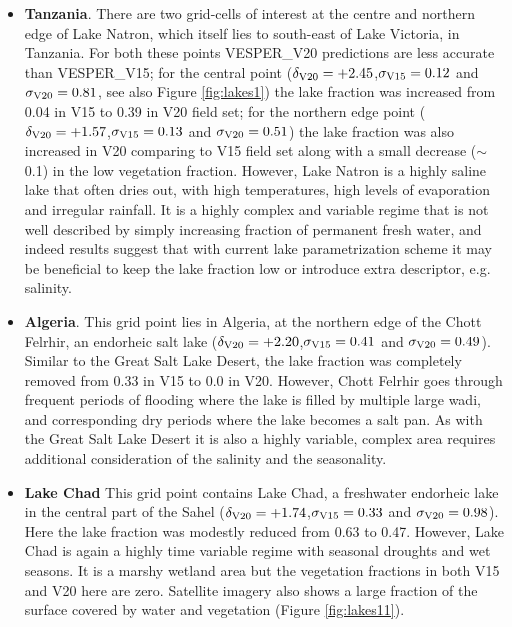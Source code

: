 \documentclass[hess, twostagejnl]{copernicus}
\begin{document}
\begin{itemize}
	\item \textbf{Tanzania}. There are two grid-cells of interest at the centre and northern edge of Lake Natron, which itself lies to south-east of Lake Victoria, in Tanzania. For both these points VESPER\_V20 predictions are less accurate than VESPER\_V15; for the central point ($\delta_{\rm V20} = +2.45$,$\sigma_{\rm V15} = 0.12$ and $\sigma_{\rm V20}=0.81$, see also Figure \ref{fig:lakes1}) the lake fraction was increased from 0.04 in V15 to 0.39 in V20 field set; for the northern edge point ($\delta_{\rm V20} = +1.57$,$\sigma_{\rm V15} = 0.13$ and $\sigma_{\rm V20}=0.51$) the lake fraction was also increased in V20 comparing to V15 field set along with a small decrease ($\sim$0.1) in the low vegetation fraction. However, Lake Natron is a highly saline lake that often dries out, with high temperatures, high levels of evaporation and irregular rainfall. It is a highly complex and variable regime that is not well described by simply increasing fraction of permanent fresh water, and indeed results suggest that with current lake parametrization scheme it may be beneficial to keep the lake fraction low or introduce extra descriptor, e.g. salinity. 

	\item \textbf{Algeria}. This grid point lies in Algeria, at the northern edge of the Chott Felrhir, an endorheic salt lake ($\delta_{\rm V20} = +2.20$,$\sigma_{\rm V15} = 0.41$ and $\sigma_{\rm V20}=0.49$). Similar to the Great Salt Lake Desert, the lake fraction was completely removed from 0.33 in V15 to 0.0 in V20. However, Chott Felrhir goes through frequent periods of flooding where the lake is filled by multiple large wadi, and corresponding dry periods where the lake becomes a salt pan. As with the Great Salt Lake Desert it is also a highly variable, complex area requires additional consideration of the salinity and the seasonality.  
	
	
	\item \textbf{Lake Chad} This grid point contains Lake Chad, a freshwater endorheic lake in the central part of the Sahel ($\delta_{\rm V20} = +1.74$,$\sigma_{\rm V15} = 0.33$ and $\sigma_{\rm V20}=0.98$). Here the lake fraction was modestly reduced from 0.63 to 0.47. However, Lake Chad is again a highly time variable regime with seasonal droughts and wet seasons. It is a marshy wetland area but the vegetation fractions in both V15 and V20 here are zero. Satellite imagery also shows a large fraction of the surface covered by water and vegetation (Figure \ref{fig:lakes11}).
	


\end{itemize}
\end{document}
